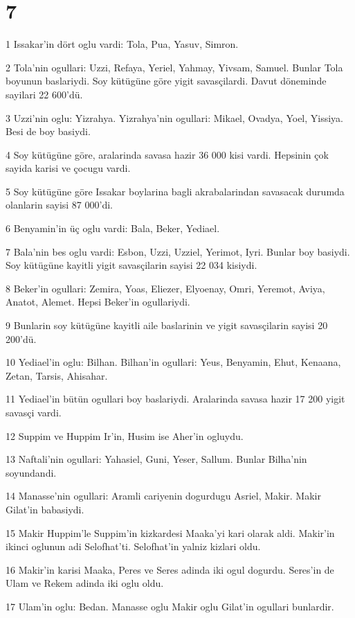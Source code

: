 \chapter{7}

\par 1 Issakar'in dört oglu vardi: Tola, Pua, Yasuv, Simron.
\par 2 Tola'nin ogullari: Uzzi, Refaya, Yeriel, Yahmay, Yivsam, Samuel. Bunlar Tola boyunun baslariydi. Soy kütügüne göre yigit savasçilardi. Davut döneminde sayilari 22 600'dü.
\par 3 Uzzi'nin oglu: Yizrahya. Yizrahya'nin ogullari: Mikael, Ovadya, Yoel, Yissiya. Besi de boy basiydi.
\par 4 Soy kütügüne göre, aralarinda savasa hazir 36 000 kisi vardi. Hepsinin çok sayida karisi ve çocugu vardi.
\par 5 Soy kütügüne göre Issakar boylarina bagli akrabalarindan savasacak durumda olanlarin sayisi 87 000'di.
\par 6 Benyamin'in üç oglu vardi: Bala, Beker, Yediael.
\par 7 Bala'nin bes oglu vardi: Esbon, Uzzi, Uzziel, Yerimot, Iyri. Bunlar boy basiydi. Soy kütügüne kayitli yigit savasçilarin sayisi 22 034 kisiydi.
\par 8 Beker'in ogullari: Zemira, Yoas, Eliezer, Elyoenay, Omri, Yeremot, Aviya, Anatot, Alemet. Hepsi Beker'in ogullariydi.
\par 9 Bunlarin soy kütügüne kayitli aile baslarinin ve yigit savasçilarin sayisi 20 200'dü.
\par 10 Yediael'in oglu: Bilhan. Bilhan'in ogullari: Yeus, Benyamin, Ehut, Kenaana, Zetan, Tarsis, Ahisahar.
\par 11 Yediael'in bütün ogullari boy baslariydi. Aralarinda savasa hazir 17 200 yigit savasçi vardi.
\par 12 Suppim ve Huppim Ir'in, Husim ise Aher'in ogluydu.
\par 13 Naftali'nin ogullari: Yahasiel, Guni, Yeser, Sallum. Bunlar Bilha'nin soyundandi.
\par 14 Manasse'nin ogullari: Aramli cariyenin dogurdugu Asriel, Makir. Makir Gilat'in babasiydi.
\par 15 Makir Huppim'le Suppim'in kizkardesi Maaka'yi kari olarak aldi. Makir'in ikinci oglunun adi Selofhat'ti. Selofhat'in yalniz kizlari oldu.
\par 16 Makir'in karisi Maaka, Peres ve Seres adinda iki ogul dogurdu. Seres'in de Ulam ve Rekem adinda iki oglu oldu.
\par 17 Ulam'in oglu: Bedan. Manasse oglu Makir oglu Gilat'in ogullari bunlardir.
